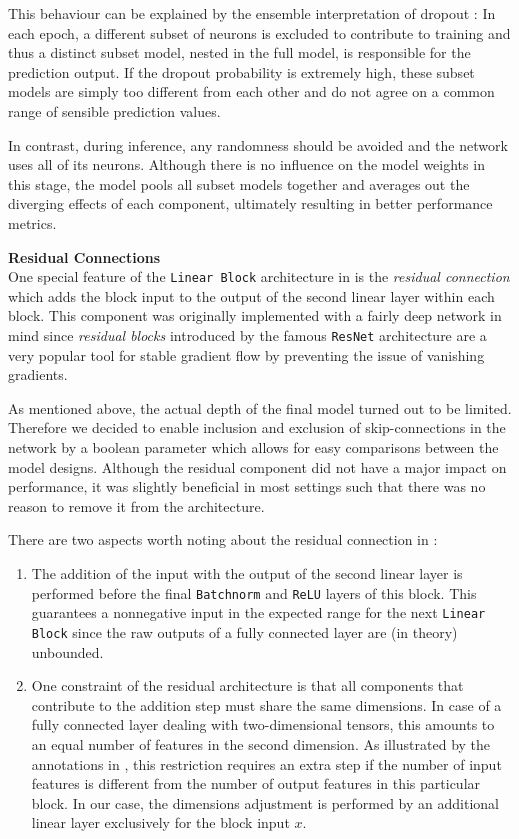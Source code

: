 This behaviour can be explained by the ensemble interpretation of dropout \citep{goodfellow2016}:
In each epoch, a different subset of neurons is excluded to contribute to training and thus a distinct subset model, nested in the full model, is responsible for the prediction output.
If the dropout probability is extremely high, these subset models are simply too different from each other and do not agree on a common range of sensible prediction values.

In contrast, during inference, any randomness should be avoided and the network uses all of its neurons.
Although there is no influence on the model weights in this stage, the model pools all subset models together and averages out the diverging effects of each component, ultimately resulting in better performance metrics.

\textbf{Residual Connections} \\
One special feature of the \texttt{Linear Block} architecture in  is the \emph{residual connection} which adds the block input to the output of the second linear layer within each block.
This component was originally implemented with a fairly deep network in mind since \emph{residual blocks} introduced by the famous \texttt{ResNet} architecture \citep{he2015} are a very popular tool for stable gradient flow by preventing the issue of vanishing gradients.

As mentioned above, the actual depth of the final model turned out to be limited.
Therefore we decided to enable inclusion and exclusion of skip-connections in the network by a boolean parameter which allows for easy comparisons between the model designs.
Although the residual component did not have a major impact on performance, it was slightly beneficial in most settings such that there was no reason to remove it from the architecture.

There are two aspects worth noting about the residual connection in :
\begin{enumerate}
  \item The addition of the input with the output of the second linear layer is performed before the final \texttt{Batchnorm} and \texttt{ReLU} layers of this block.
        This guarantees a nonnegative input in the expected range for the next \texttt{Linear Block} since the raw outputs of a fully connected layer are (in theory) unbounded.

  \item One constraint of the residual architecture is that all components that contribute to the addition step must share the same dimensions.
        In case of a fully connected layer dealing with two-dimensional tensors, this amounts to an equal number of features in the second dimension.
        As illustrated by the annotations in , this restriction requires an extra step if the number of input features is different from the number of output features in this particular block.
        In our case, the dimensions adjustment is performed by an additional linear layer exclusively for the block input $x$.
\end{enumerate}

